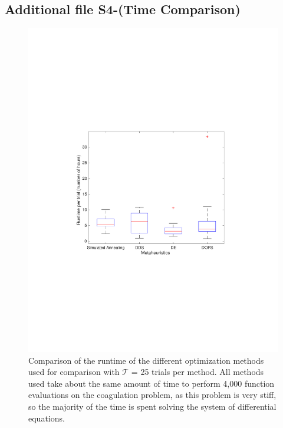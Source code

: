 \documentclass{bmcart}
\begin{document}
\begin{backmatter}
\subsection*{Additional file S4-(Time Comparison)}
\begin{figure}[ht]
\centering
\includegraphics[trim = {0 5cm 0 5cm }, clip, width=1.00\textwidth]{./rachelfigs/TimeComparsion.pdf}
\caption{ Comparison of the runtime of the different optimization methods used for comparison with  $\mathcal{T}$ = 25 trials per method. All methods used take about the same amount of time to perform 4,000 function evaluations on the coagulation problem, as this problem is very stiff, so the majority of the time is spent solving the system of differential equations.
}\label{fig-time-comparsion}
\end{figure}


\end{backmatter}
\end{document}
